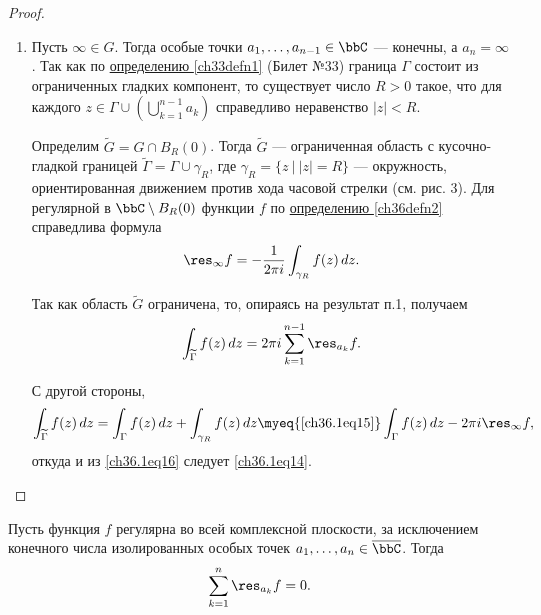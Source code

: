 \begin{leftbar}
\begin{proof}
\begin{enumerate}
\item	Пусть $\infty \in G$. Тогда особые точки $a_1,\ldots,a_{n - 1} \in \bbC$ --- конечны, а $a_n = \infty$. Так как по \hyperref[ch33defn1]{определению \ref{ch33defn1}} (Билет №33) граница $\Gamma$ состоит из ограниченных гладких компонент, то существует число $R > 0$ такое, что для каждого $z \in \Gamma \cup \left( \bigcup\limits_{k = 1}^{n - 1} a_k \right)$ справедливо неравенство $|z| < R$.

Определим $\widetilde{G} = G \cap B_R(0)$. Тогда $\widetilde G$ — ограниченная область с кусочно-гладкой границей $\widetilde{\Gamma} = \Gamma \cup \gamma_R$, где $\gamma_R = \{ z \: \big| \: |z| = R\}$ --- окружность, ориентированная движением против хода часовой стрелки (см. рис. 3). Для регулярной в $\bbC \setminus B_R(0)$ функции $f$ по \hyperref[ch36defn2]{определению \ref{ch36defn2}} справедлива формула
\begin{equation} \label{ch36.1eq15}
\res_{\infty} f = - \frac{1}{2\pi i} \int_{\gamma_R} f(z) \,dz.
\end{equation}

Так как область $\widetilde{G}$ ограничена, то, опираясь на результат п.1, получаем
\begin{equation} \label{ch36.1eq16}
\int_{\widetilde{\Gamma}} f(z) \,dz = 2\pi i \sum_{k = 1}^{n - 1} \res_{a_k} f.
\end{equation}
 
С другой стороны,
$$
\int_{\widetilde{\Gamma}} f(z) \,dz = \int_{\Gamma} f(z) \,dz + \int_{\gamma_R} f(z) \,dz \myeq{\eqref{ch36.1eq15}} \int_{\Gamma} f(z) \,dz - 2\pi i\res_{\infty} f,
$$
откуда и из \eqref{ch36.1eq16} следует \eqref{ch36.1eq14}.	
\end{enumerate}
\end{proof}
\end{leftbar}

\begin{cons}
Пусть функция $f$ регулярна во всей комплексной плоскости, за исключением конечного числа изолированных особых точек $a_1,\ldots,a_n \in \overline{\bbC}$. Тогда
\begin{equation} \label{ch36.1eq17}
\sum_{k = 1}^{n} \res_{a_k} f = 0.
\end{equation}
\end{cons}

